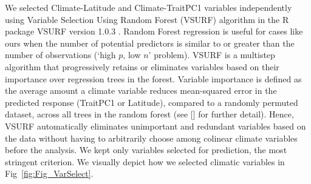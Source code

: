 \documentclass[11pt, oneside]{article}
\newcommand{\pkg}[1]{{\fontseries{b}\selectfont #1}}
\begin{document}
We selected Climate-Latitude and Climate-TraitPC1 variables independently using Variable Selection Using Random Forest (VSURF) algorithm in the R package \pkg{VSURF} version 1.0.3 \citep{Genuer_etal_2016}. Random Forest regression is useful for cases like ours when the number of potential predictors is similar to or greater than the number of observations (`high $p$, low $n$' problem). VSURF is a multistep algorithm that progressively retains or eliminates variables based on their importance over regression trees in the forest. Variable importance is defined as the average amount a climate variable reduces mean-squared error in the predicted response (TraitPC1 or Latitude), compared to a randomly permuted dataset, across all trees in the random forest (see \citeauthor{Genuer_etal_2015} [\citeyear{Genuer_etal_2015}] for further detail). Hence, VSURF automatically eliminates unimportant and redundant variables based on the data without having to arbitrarily choose among colinear climate variables before the analysis. We kept only variables selected for prediction, the most stringent criterion. We visually depict how we selected climatic variables in Fig~\ref{fig:Fig_VarSelect}. 


\end{document}
